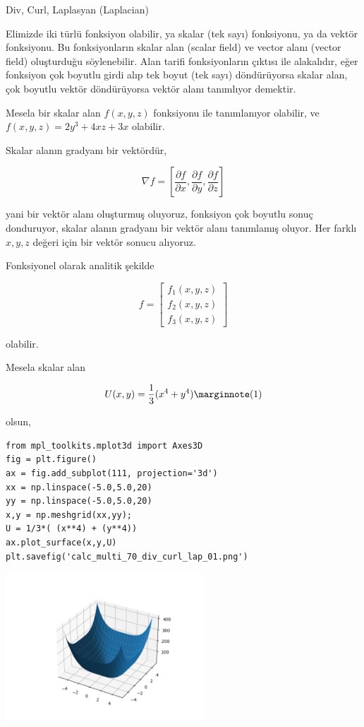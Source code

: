 \documentclass[12pt,fleqn]{article}\usepackage{../../common}
\begin{document}
Div, Curl, Laplasyan (Laplacian)

Elimizde iki türlü fonksiyon olabilir, ya skalar (tek sayı) fonksiyonu, ya da
vektör fonksiyonu. Bu fonksiyonların skalar alan (scalar field) ve vector alanı
(vector field) oluşturduğu söylenebilir. Alan tarifi fonksiyonların çıktısı ile
alakalıdır, eğer fonksiyon çok boyutlu girdi alıp tek boyut (tek sayı)
döndürüyorsa skalar alan, çok boyutlu vektör döndürüyorsa vektör alanı
tanımlıyor demektir.

Mesela bir skalar alan $f(x,y,z)$ fonksiyonu ile tanımlanıyor olabilir, ve
$f(x,y,z) = 2y^3 + 4 xz + 3x$ olabilir.

Skalar alanın gradyanı bir vektördür,

$$
\nabla f = \left[
  \frac{\partial f}{\partial x}, 
  \frac{\partial f}{\partial y}, 
  \frac{\partial f}{\partial z}
\right]
$$

yani bir vektör alanı oluşturmuş oluyoruz, fonksiyon çok boyutlu sonuç
donduruyor, skalar alanın gradyanı bir vektör alanı tanımlamış oluyor. Her
farklı $x,y,z$ değeri için bir vektör sonucu alıyoruz.

Fonksiyonel olarak analitik şekilde

$$
f = \left[\begin{array}{r} f_1(x,y,z) \\ f_2(x,y,z) \\ f_3(x,y,z) \end{array}\right]
$$

olabilir.

Mesela skalar alan

$$
U(x,y) = \frac{1}{3} (x^4 + y^4)
\mlabel{1}
$$

olsun,

\begin{verbatim}
from mpl_toolkits.mplot3d import Axes3D
fig = plt.figure()
ax = fig.add_subplot(111, projection='3d')
xx = np.linspace(-5.0,5.0,20)
yy = np.linspace(-5.0,5.0,20)
x,y = np.meshgrid(xx,yy);
U = 1/3*( (x**4) + (y**4))
ax.plot_surface(x,y,U)
plt.savefig('calc_multi_70_div_curl_lap_01.png')
\end{verbatim}

\includegraphics[width=20em]{calc_multi_70_div_curl_lap_01.png}
\end{document}
